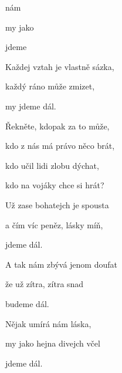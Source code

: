 

\zs
{} nám 

my jako  

jdeme    

Každej vztah je vlastně sázka,

každý ráno může zmizet,

my jdeme dál.
\ks

\zr
Řekněte, kdopak za to může,

kdo z nás má právo něco brát,

kdo učil lidi zlobu dýchat,

kdo na vojáky chce si hrát?
\kr

\zs
Už zase bohatejch je spousta

a čím víc peněz, lásky míň,

jdeme dál.

A tak nám zbývá jenom doufat

že už zítra, zítra snad

budeme dál.
\ks

\zr\kr

\zs
Nějak umírá nám láska,

my jako hejna divejch včel

jdeme dál.
\ks

\kp
